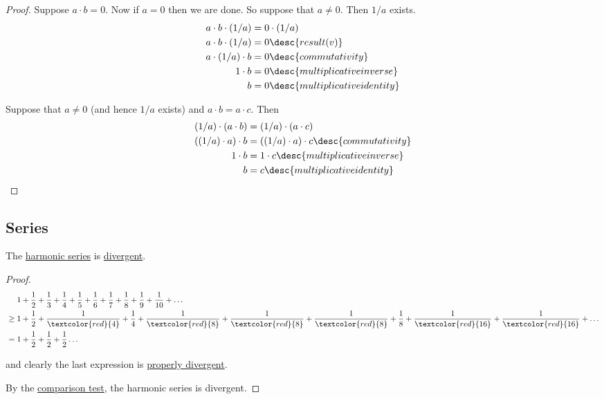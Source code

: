 \begin{proof}
   Suppose $a\cdot b=0$. Now if $a=0$ then we are done. So
  suppose that $a\neq0$. Then $1/a$ exists.
  \begin{align*}
    a\cdot b\cdot(1/a) &=0\cdot(1/a)                     \\
    a\cdot b\cdot(1/a) &=0\desc{result (v)}              \\
    a\cdot(1/a)\cdot b &=0\desc{commutativity}           \\
    1\cdot b           &=0\desc{multiplicative inverse}  \\
    b                  &=0\desc{multiplicative identity}
  \end{align*}

   Suppose that $a\neq0$ (and hence $1/a$ exists) and $a\cdot
  b=a\cdot c$. Then
  \begin{align*}
    (1/a)\cdot(a\cdot b)  &=(1/a)\cdot(a\cdot c)                      \\
    ((1/a)\cdot a)\cdot b &=((1/a)\cdot a)\cdot c\desc{commutativity} \\
    1\cdot b              &=1\cdot c\desc{multiplicative inverse}     \\
    b                     &= c\desc{multiplicative identity}
  \end{align*}
\end{proof}

\subsection{Series}\label{db2402e}

\label{ffaeb85}

The \href{c9bddda}{harmonic series} is \href{f8901df}{divergent}.

\begin{proof}
  \def\f#1{\frac1{#1}}
  \def\r#1{\f{\textcolor{red}{#1}}}
  \begin{align*}
     &\mathrel{\phantom{=}}1+\f2+\f3+\f4+\f5+\f6+\f7+\f8+\f9+\f{10}+\ldots \\
     &\geq1+\f2+\r4+\f4+\r8+\r8+\r8+\f8+\r{16}+\r{16}+\ldots               \\
     &=1+\f2+\f2+\f2\ldots
  \end{align*}

  and clearly the last expression is \href{eb71424}{properly divergent}.

  By the \href{d0856d6}{comparison test}, the harmonic series is divergent.
\end{proof}

